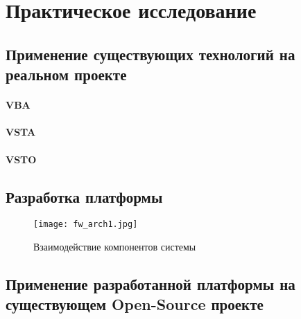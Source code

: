 \section{Практическое исследование}

\subsection{Применение существующих технологий на реальном проекте}
\paragraph{VBA}
\paragraph{VSTA}
\paragraph{VSTO}

\subsection{Разработка платформы}

\begin{figure}[!h]
    \centering
    \texttt{[image: fw\_arch1.jpg]}
    \caption{Взаимодействие компонентов системы}
    \label{fw_arch1}
\end{figure}

\subsection{Применение разработанной платформы на существующем Open-Source проекте}

\pagebreak